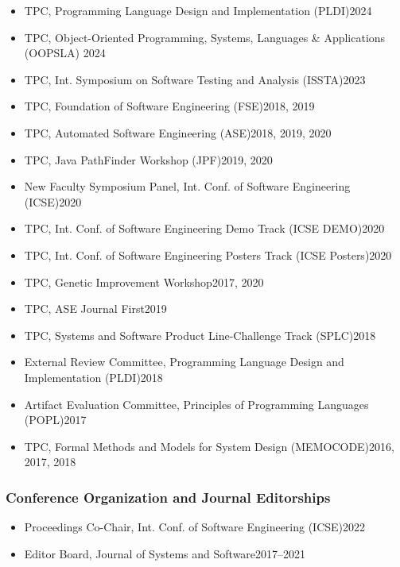 \documentclass[11pt]{article}
\begin{document}
    \begin{itemize}
      \item TPC, Programming Language Design and Implementation (PLDI)\hfill 2024
      \item TPC, Object-Oriented Programming, Systems, Languages \& Applications (OOPSLA) \hfill 2024
      \item TPC,  Int. Symposium on Software Testing and Analysis (ISSTA)\hfill 2023
      \item TPC, Foundation of Software Engineering (FSE)\hfill 2018, 2019
      \item TPC, Automated Software Engineering (ASE)\hfill 2018, 2019, 2020
      \item TPC, Java PathFinder Workshop (JPF)\hfill 2019, 2020
      \item New Faculty Symposium Panel, Int. Conf. of Software Engineering (ICSE)\hfill 2020
      \item TPC, Int. Conf. of Software Engineering Demo Track (ICSE DEMO)\hfill 2020
      \item TPC, Int. Conf. of Software Engineering Posters Track (ICSE Posters)\hfill 2020
      \item TPC, Genetic Improvement Workshop\hfill 2017, 2020
      \item TPC, ASE Journal First\hfill 2019
      \item TPC, Systems and Software Product Line-Challenge Track (SPLC)\hfill 2018
      \item External Review Committee, Programming Language Design and Implementation (PLDI)\hfill 2018
      \item Artifact Evaluation Committee, Principles of Programming Languages (POPL)\hfill 2017
      \item TPC, Formal Methods and Models for System Design (MEMOCODE)\hfill 2016, 2017, 2018
    \end{itemize}

    \subsubsection{Conference Organization and Journal Editorships}
    \begin{itemize}
      \item Proceedings Co-Chair,  Int. Conf. of Software Engineering (ICSE)\hfill 2022
      \item Editor Board, Journal of Systems and Software\hfill 2017--2021
    \end{itemize}
\end{document}
